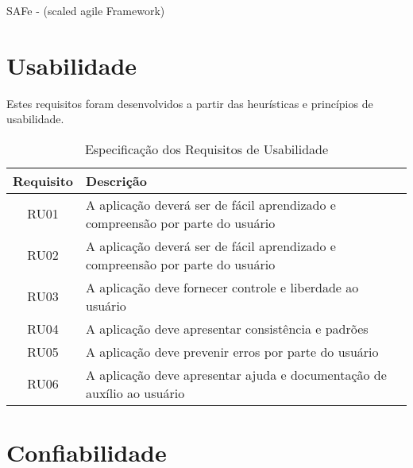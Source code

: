 \begin{apendicesenv}
SAFe - (scaled agile Framework)

{\large {\section { Usabilidade \\ } } }

Estes requisitos foram desenvolvidos a partir das heurísticas e princípios de usabilidade. 


\begin{table}[H]
                \centering
                \caption{Especificação dos Requisitos de Usabilidade}
                \begin{tabular}{c|p{10cm}}
                    \hline
                    \textbf{Requisito}            & \textbf{Descrição}\\
                    \hline
                    RU01 & A aplicação deverá ser de fácil aprendizado e compreensão por parte do usuário \\ 
                    \hline
                    RU02 & A aplicação deverá ser de fácil aprendizado e compreensão por parte do usuário \\ 
                    RU03 & A aplicação deve fornecer controle e liberdade ao usuário\\ 
                    \hline
                    RU04 & A aplicação deve apresentar consistência e padrões\\
                    \hline
                    RU05 & A aplicação deve prevenir erros por parte do usuário\\
                    \hline
                    RU06 & A aplicação deve apresentar ajuda e documentação de auxílio ao usuário\\
                    \hline                    
                \end{tabular}
            \end{table}


{\large {\section { Confiabilidade \\ } } }


\end{apendicesenv}
